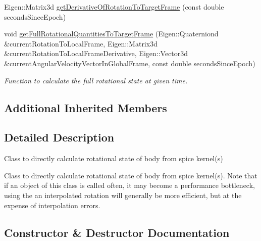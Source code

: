 \begin{DoxyCompactItemize}
Eigen\+::\+Matrix3d \hyperlink{classtudat_1_1ephemerides_1_1SpiceRotationalEphemeris_a0108d04795daa600b6614d9c48046ce0}{get\+Derivative\+Of\+Rotation\+To\+Target\+Frame} (const double seconds\+Since\+Epoch)
\item 
void \hyperlink{classtudat_1_1ephemerides_1_1SpiceRotationalEphemeris_af7a669375d65d14ac82b54e3a4b84ae1}{get\+Full\+Rotational\+Quantities\+To\+Target\+Frame} (Eigen\+::\+Quaterniond \&current\+Rotation\+To\+Local\+Frame, Eigen\+::\+Matrix3d \&current\+Rotation\+To\+Local\+Frame\+Derivative, Eigen\+::\+Vector3d \&current\+Angular\+Velocity\+Vector\+In\+Global\+Frame, const double seconds\+Since\+Epoch)
\begin{DoxyCompactList}\small\item\em Function to calculate the full rotational state at given time. \end{DoxyCompactList}\end{DoxyCompactItemize}
\subsection*{Additional Inherited Members}


\subsection{Detailed Description}
Class to directly calculate rotational state of body from spice kernel(s) 

Class to directly calculate rotational state of body from spice kernel(s). Note that if an object of this class is called often, it may become a performance bottleneck, using the an interpolated rotation will generally be more efficient, but at the expense of interpolation errors. 

\subsection{Constructor \& Destructor Documentation}

